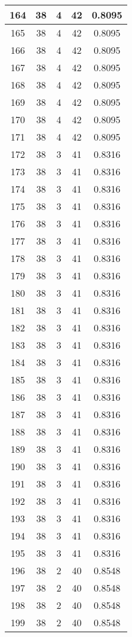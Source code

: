 \documentclass[letterpaper, 12pt]{article}
\begin{document}
\begin{longtable}{|c|c|c|c|c|}
\hline
164 & 38 & 4 & 42 & 0.8095 \\
\hline
165 & 38 & 4 & 42 & 0.8095 \\
\hline
166 & 38 & 4 & 42 & 0.8095 \\
\hline
167 & 38 & 4 & 42 & 0.8095 \\
\hline
168 & 38 & 4 & 42 & 0.8095 \\
\hline
169 & 38 & 4 & 42 & 0.8095 \\
\hline
170 & 38 & 4 & 42 & 0.8095 \\
\hline
171 & 38 & 4 & 42 & 0.8095 \\
\hline
172 & 38 & 3 & 41 & 0.8316 \\
\hline
173 & 38 & 3 & 41 & 0.8316 \\
\hline
174 & 38 & 3 & 41 & 0.8316 \\
\hline
175 & 38 & 3 & 41 & 0.8316 \\
\hline
176 & 38 & 3 & 41 & 0.8316 \\
\hline
177 & 38 & 3 & 41 & 0.8316 \\
\hline
178 & 38 & 3 & 41 & 0.8316 \\
\hline
179 & 38 & 3 & 41 & 0.8316 \\
\hline
180 & 38 & 3 & 41 & 0.8316 \\
\hline
181 & 38 & 3 & 41 & 0.8316 \\
\hline
182 & 38 & 3 & 41 & 0.8316 \\
\hline
183 & 38 & 3 & 41 & 0.8316 \\
\hline
184 & 38 & 3 & 41 & 0.8316 \\
\hline
185 & 38 & 3 & 41 & 0.8316 \\
\hline
186 & 38 & 3 & 41 & 0.8316 \\
\hline
187 & 38 & 3 & 41 & 0.8316 \\
\hline
188 & 38 & 3 & 41 & 0.8316 \\
\hline
189 & 38 & 3 & 41 & 0.8316 \\
\hline
190 & 38 & 3 & 41 & 0.8316 \\
\hline
191 & 38 & 3 & 41 & 0.8316 \\
\hline
192 & 38 & 3 & 41 & 0.8316 \\
\hline
193 & 38 & 3 & 41 & 0.8316 \\
\hline
194 & 38 & 3 & 41 & 0.8316 \\
\hline
195 & 38 & 3 & 41 & 0.8316 \\
\hline
196 & 38 & 2 & 40 & 0.8548 \\
\hline
197 & 38 & 2 & 40 & 0.8548 \\
\hline
198 & 38 & 2 & 40 & 0.8548 \\
\hline
199 & 38 & 2 & 40 & 0.8548 \\
\hline
\end{longtable}
\end{document}
